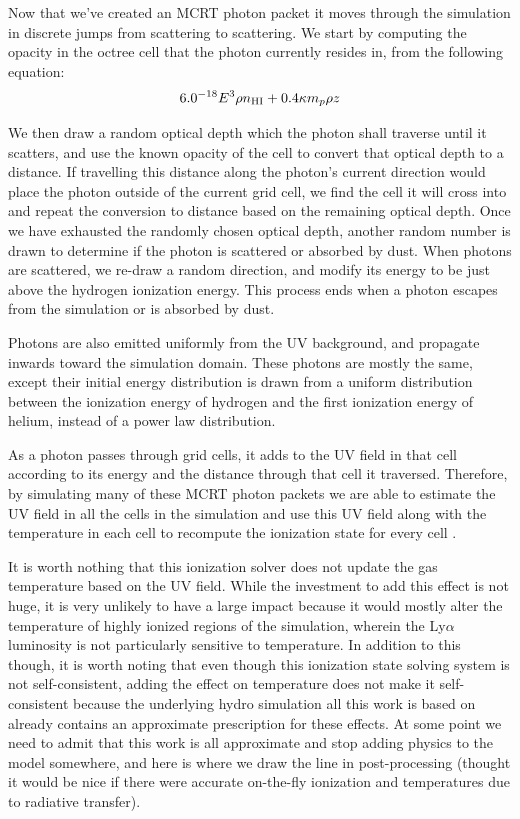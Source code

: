 Now that we've created an MCRT photon packet it moves through the simulation in discrete jumps from scattering to scattering.
We start by computing the opacity in the octree cell that the photon currently resides in, from the following equation:
\begin{equation}
    \label{eq:lycrt_opacity}
    6.0^{-18} E^{3} \rho n_{\rm{HI}} + 0.4 \kappa m_{p} \rho z
\end{equation}

We then draw a random optical depth which the photon shall traverse until it scatters, and use the known opacity of the cell to convert that optical depth to a distance.
If travelling this distance along the photon's current direction would place the photon outside of the current grid cell, we find the cell it will cross into and repeat the conversion to distance based on the remaining optical depth.
Once we have exhausted the randomly chosen optical depth, another random number is drawn to determine if the photon is scattered or absorbed by dust.
When photons are scattered, we re-draw a random direction, and modify its energy to be just above the hydrogen ionization energy.
This process ends when a photon escapes from the simulation or is absorbed by dust.

Photons are also emitted uniformly from the UV background, and propagate inwards toward the simulation domain.
These photons are mostly the same, except their initial energy distribution is drawn from a uniform distribution between the ionization energy of hydrogen and the first ionization energy of helium, instead of a power law distribution.

As a photon passes through grid cells, it adds to the UV field in that cell according to its energy and the distance through that cell it traversed.
Therefore, by simulating many of these MCRT photon packets we are able to estimate the UV field in all the cells in the simulation and use this UV field along with the temperature in each cell to recompute the ionization state for every cell \citep{Kasen2006}.

It is worth nothing that this ionization solver does not update the gas temperature based on the UV field.
While the investment to add this effect is not huge, it is very unlikely to have a large impact because it would mostly alter the temperature of highly ionized regions of the simulation, wherein the Ly$\alpha$ luminosity is not particularly sensitive to temperature.
In addition to this though, it is worth noting that even though this ionization state solving system is not self-consistent, adding the effect on temperature does not make it self-consistent because the underlying hydro simulation all this work is based on already contains an approximate prescription for these effects.
At some point we need to admit that this work is all approximate and stop adding physics to the model somewhere, and here is where we draw the line in post-processing (thought it would be nice if there were accurate on-the-fly ionization and temperatures due to radiative transfer).


